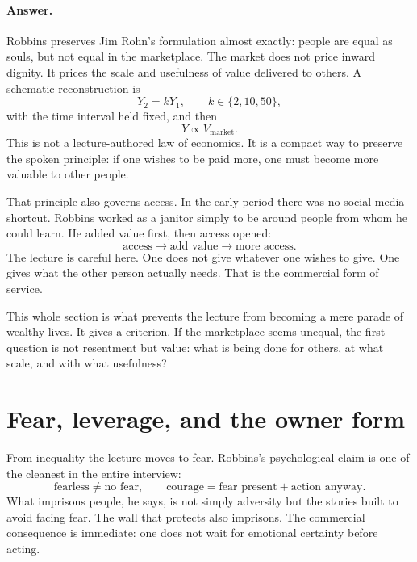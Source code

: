 \paragraph{Answer.} Robbins preserves Jim Rohn's formulation almost exactly: people are equal as souls, but not equal in the marketplace. The market does not price inward dignity. It prices the scale and usefulness of value delivered to others. A schematic reconstruction is
\begin{equation}
Y_2 = kY_1, \qquad k\in\{2,10,50\},
\end{equation}
with the time interval held fixed, and then
\begin{equation}
Y \propto V_{\text{market}}.
\end{equation}
This is not a lecture-authored law of economics. It is a compact way to preserve the spoken principle: if one wishes to be paid more, one must become more valuable to other people.

That principle also governs access. In the early period there was no social-media shortcut. Robbins worked as a janitor simply to be around people from whom he could learn. He added value first, then access opened:
\begin{equation}
\text{access} \to \text{add value} \to \text{more access}.
\end{equation}
The lecture is careful here. One does not give whatever one wishes to give. One gives what the other person actually needs. That is the commercial form of service.

This whole section is what prevents the lecture from becoming a mere parade of wealthy lives. It gives a criterion. If the marketplace seems unequal, the first question is not resentment but value: what is being done for others, at what scale, and with what usefulness?

\section{Fear, leverage, and the owner form}

From inequality the lecture moves to fear. Robbins's psychological claim is one of the cleanest in the entire interview:
\begin{equation}
\text{fearless} \neq \text{no fear}, \qquad
\text{courage} = \text{fear present} + \text{action anyway}.
\end{equation}
What imprisons people, he says, is not simply adversity but the stories built to avoid facing fear. The wall that protects also imprisons. The commercial consequence is immediate: one does not wait for emotional certainty before acting.

